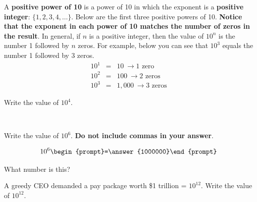 \documentclass{ximera}
\begin{document}
A \textbf{positive power of 10} is a power of 10 in which the exponent is a \textbf{positive integer}: $\{1, 2, 3, 4, \ldots\}.$
Below are the first three positive powers of 10.  \textbf{Notice that the exponent in each power of 10 matches the number of zeros in the result}.  In general, if $n$ is a positive integer, then the value of $10^n$ is the number 1 followed by $n$ zeros.  For example, below you can see that $10^3$ equals the number 1 followed by 3 zeros.
\begin{eqnarray*}
10^1 &=& 10 \ \rightarrow \textrm{1 zero}\\
10^2 &=& 100  \ \rightarrow \textrm{2 zeros} \\
10^3 &=& 1,000 \ \rightarrow \textrm{3 zeros}
\end{eqnarray*}


\begin{question} Write the value of $10^4.$

~ \\[1em]  %

\begin{multipleChoice}
  \end{multipleChoice}

\end{question}

\begin{question} Write the value of $10^6.$  \textbf{Do not include commas in your answer}. 


\[ 10^6 \begin{prompt}=\answer{1000000}\end{prompt} \]

What number is this?

\begin{multipleChoice}
  \end{multipleChoice}


\end{question}


\begin{question} A greedy CEO demanded a pay package worth \$1 trillion = $10^{12}.$  Write the value of $10^{12}.$

\begin{multipleChoice}
  \end{multipleChoice}

\end{question}
\end{document}

